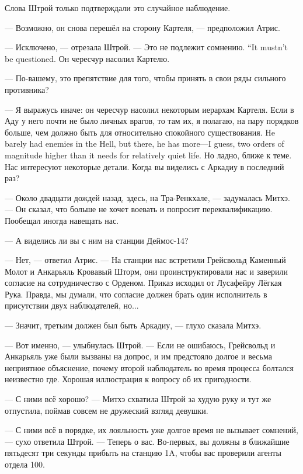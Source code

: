 Слова Штрой только подтверждали это случайное наблюдение.

--- Возможно, он снова перешёл на сторону Картеля, --- предположил Атрис.

--- Исключено, --- отрезала Штрой.
{--- Это не подлежит сомнению.}
{``It mustn't be questioned.}
Он чересчур насолил Картелю.

--- По-вашему, это препятствие для того, чтобы принять в свои ряды сильного противника?

--- Я выражусь иначе: он чересчур насолил некоторым иерархам Картеля.
{Если в Аду у него почти не было личных врагов, то там их, я полагаю, на пару порядков больше, чем должно быть для относительно спокойного существования.}
{He barely had enemies in the Hell, but there, he has more---I guess, two orders of magnitude higher than it needs for relatively quiet life.}
Но ладно, ближе к теме.
Нас интересуют некоторые детали.
Когда вы виделись с Аркадиу в последний раз?

--- Около двадцати дождей назад, здесь, на Тра-Ренкхале, --- задумалась Митхэ.
--- Он сказал, что больше не хочет воевать и попросит переквалификацию.
Пообещал иногда навещать нас.

--- А виделись ли вы с ним на станции Деймос-14?

--- Нет, --- ответил Атрис.
--- На станции нас встретили Грейсвольд Каменный Молот и Анкарьяль Кровавый Шторм, они проинструктировали нас и заверили согласие на сотрудничество с Орденом.
Приказ исходил от Лусафейру Лёгкая Рука.
Правда, мы думали, что согласие должен брать один исполнитель в присутствии двух наблюдателей, но...

--- Значит, третьим должен был быть Аркадиу, --- глухо сказала Митхэ.

--- Вот именно, --- улыбнулась Штрой.
--- Если не ошибаюсь, Грейсвольд и Анкарьяль уже были вызваны на допрос, и им предстояло долгое и весьма неприятное объяснение, почему второй наблюдатель во время процесса болтался неизвестно где.
Хорошая иллюстрация к вопросу об их пригодности.

--- С ними всё хорошо? --- Митхэ схватила Штрой за худую руку и тут же отпустила, поймав совсем не дружеский взгляд девушки.

--- С ними всё в порядке, их лояльность уже долгое время не вызывает сомнений, --- сухо ответила Штрой.
--- Теперь о вас.
Во-первых, вы должны в ближайшие пятьдесят три секунды прибыть на станцию 1A, чтобы вас проверили агенты отдела 100.

